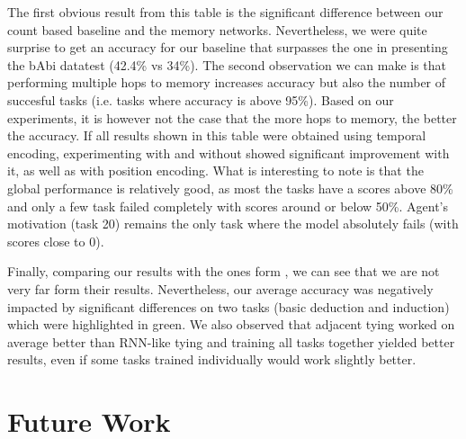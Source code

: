 \documentclass[twoside,11pt]{article}
\begin{document}
\noindent The first obvious result from this table is the significant difference between our count based baseline and the memory networks. Nevertheless, we were quite surprise to get an accuracy for our baseline that surpasses the one in \cite{mem} presenting the bAbi datatest (42.4\% vs 34\%). The second observation we can make is that performing multiple hops to memory increases accuracy but also the number of succesful tasks (i.e. tasks where accuracy is above 95\%). Based on our experiments, it is however not the case that the more hops to memory, the better the accuracy. If all results shown in this table were obtained using temporal encoding, experimenting with and without showed significant improvement with it, as well as with position encoding. What is interesting to note is that the global performance is relatively good, as most the tasks have a scores above 80\% and only a few task failed completely with scores around or below 50\%. Agent's motivation (task 20) remains the only task where the model absolutely fails (with scores close to 0). 

\noindent Finally, comparing our results with the ones form \cite{mem}, we can see that we are not very far form their results. Nevertheless, our average accuracy was negatively impacted by significant differences on two tasks (basic deduction and induction) which were highlighted in green. We also observed that adjacent tying worked on average better than RNN-like tying and training all tasks together yielded better results, even if some tasks trained individually would work slightly better.

\section{Future Work}
\end{document}
